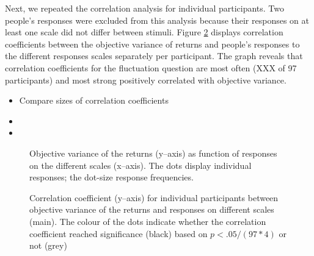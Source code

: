\documentclass[a4paper,doc, natbib]{apa6} %
\begin{document}
Next, we repeated the correlation analysis for individual participants. Two people's responses were excluded from this analysis because their responses on at least one scale did not differ between stimuli. Figure \ref{fig:rsvoind} displays correlation coefficients between the objective variance of returns and people's responses to the different responses scales separately per participant. The graph reveals that correlation coefficients for the fluctuation question are most often (XXX of 97 participants) and most strong positively correlated with objective variance. 

\begin{itemize}
\item Compare sizes of correlation coefficients
\item 
\item 
\end{itemize}


\begin{figure}[!htbp] 
  \centering
  \caption{Objective variance of the returns (y--axis) as function of responses on the different scales (x--axis). The dots display individual responses; the dot-size response frequencies.}
  \label{fig:rsvo}
\end{figure}


\begin{figure}[!htbp] 
  \centering
  \caption{Correlation coefficient (y--axis) for individual participants between objective variance of the returns and responses on different scales (main). The colour of the dots indicate whether the correlation coefficient reached significance (black) based on $p < .05 / (97 * 4)$ or not (grey)}
  \label{fig:rsvoind}
\end{figure}
\end{document}
